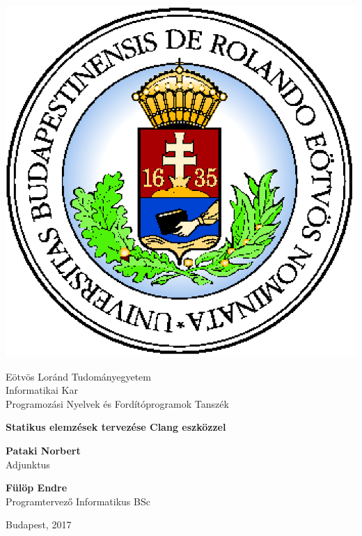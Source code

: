 \begin{titlepage}
\thispagestyle{empty}

\begin{minipage}{0.30\linewidth}
\includegraphics[scale=0.4]{eltecimer.eps}
\end{minipage}
\begin{minipage}{0.50\linewidth}
\begin{center}
Eötvös Loránd Tudományegyetem \\
Informatikai Kar\\
Programozási Nyelvek és Fordítóprogramok Tanszék
\end{center}
\end{minipage}


\vspace{7cm}

\begin{center}
\Huge
\textbf{Statikus elemzések tervezése Clang eszközzel}
\normalsize
\end{center}

\vspace{5.4cm}


\begin{minipage}{0.5\linewidth}
\textbf{Pataki Norbert}\\
Adjunktus
\end{minipage}
\begin{minipage}{0.5\linewidth}
\textbf{Fülöp Endre}\\
Programtervező Informatikus BSc
\end{minipage}

\vspace{4.5cm}

\begin{center}
Budapest, 2017
\end{center}

\end{titlepage}

\endinput
